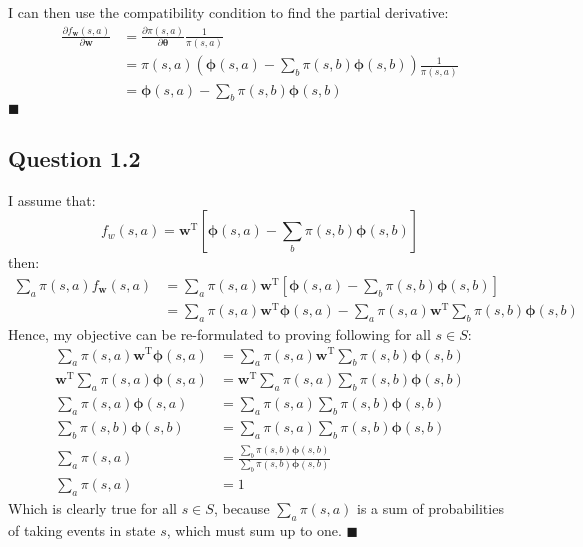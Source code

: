 \documentclass[a4paper]{article}
\newcommand*{\QEDA}{\hfill\ensuremath{\blacksquare}}%
\newcommand*{\bs}[1]{\boldsymbol{#1}}
\begin{document}
I can then use the compatibility condition to find the partial derivative:
\begin{align*}
  \frac{\partial f_{\boldsymbol{w}}(s, a)}{\partial \boldsymbol{w}}
    &=\frac{\partial \pi(s, a)}{\partial \boldsymbol{\theta}} \frac{1}{\pi(s, a)}\\
    &= \pi(s, a)\left(\boldsymbol{\phi}(s, a)-\sum_{b}\pi(s, b)\boldsymbol{\phi}(s, b)\right)
  \frac{1}{\pi(s, a)}\\
  &=\boldsymbol{\phi}(s, a)-\sum_{b}\pi(s, b)\boldsymbol{\phi}(s, b)
\end{align*}
\QEDA

\subsection*{Question 1.2}
\label{subsec:12}
I assume that:
\[
f_{w}(s, a)=\boldsymbol{w}^{\mathrm{T}}\left[\bs{\phi}(s, a)-\sum_{b} \pi(s, b) \bs{\phi}(s, b)\right]
\]
then:
\begin{align*}
  \sum_{a} \pi(s, a) f_{\boldsymbol{w}}(s, a)
  &=
  \sum_{a} \pi(s, a) \boldsymbol{w}^{\mathrm{T}}
  \left[\bs{\phi}(s, a)-\sum_{b} \pi(s, b) \bs{\phi}(s, b)\right]\\
  &=
  \sum_{a} \pi(s, a) \boldsymbol{w}^{\mathrm{T}}
  \bs{\phi}(s, a)-
  \sum_{a} \pi(s, a) \boldsymbol{w}^{\mathrm{T}}
  \sum_{b} \pi(s, b) \bs{\phi}(s, b)
\end{align*}
Hence, my objective can be re-formulated to proving following for all $s\in S$:
\begin{align*}
  \sum_{a} \pi(s, a) \boldsymbol{w}^{\mathrm{T}}\bs{\phi}(s, a)
  &=
  \sum_{a} \pi(s, a) \boldsymbol{w}^{\mathrm{T}}\sum_{b} \pi(s, b) \bs{\phi}(s, b)\\
  \boldsymbol{w}^{\mathrm{T}} \sum_{a} \pi(s, a) \bs{\phi}(s, a)
  &=
   \boldsymbol{w}^{\mathrm{T}}\sum_{a} \pi(s, a)\sum_{b} \pi(s, b) \bs{\phi}(s, b)\\
   \sum_{a} \pi(s, a) \bs{\phi}(s, a)
  &=
   \sum_{a} \pi(s, a)\sum_{b} \pi(s, b) \bs{\phi}(s, b)\\
   \sum_{b} \pi(s, b) \bs{\phi}(s, b)
  &=
   \sum_{a} \pi(s, a)\sum_{b} \pi(s, b) \bs{\phi}(s, b)\\
   \sum_{a} \pi(s, a)
  &=
   \frac{\sum_{b} \pi(s, b) \bs{\phi}(s, b)}{\sum_{b} \pi(s, b) \bs{\phi}(s, b)}\\
   \sum_{a}\pi(s, a) &= 1
\end{align*}
Which is clearly true for all $s \in S$, because 
   $\sum_{a}\pi(s, a)$ is a sum of probabilities of taking events in state $s$,
which must sum up to one.
\QEDA
\end{document}
